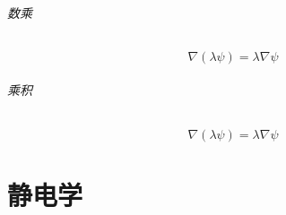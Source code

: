 \documentclass[12pt,a4paper]{ctexart}
\numberwithin{equation}{section}
\begin{document}
                \paragraph*{数乘}
                    \begin{equation}
                        \nabla (\lambda\psi) = \lambda \nabla \psi \label{eq11}
                    \end{equation}
                \paragraph*{乘积}
                    \begin{equation}
                        \nabla (\lambda\psi) = \lambda \nabla \psi \label{eq11}
                    \end{equation}

\newpage

    \part{静电学}












    
\end{document}
